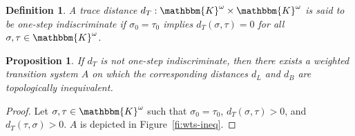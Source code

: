 \documentclass[copyright,creativecommons,sharealike]{eptcs}
\theoremstyle{plain}
\newtheorem{definition}[theorem]{Definition}
\newtheorem{proposition}[theorem]{Proposition}
\renewcommand*\K{\mathbbm{K}}
\begin{document}
\begin{definition}
  A trace distance $d_T: \K^\omega\times \K^\omega$ is said to be
  \emph{one-step indiscriminate} if $\sigma_0= \tau_0$ implies $d_T(
  \sigma, \tau)= 0$ for all $\sigma, \tau\in \K^\omega$.
\end{definition}

\begin{proposition}
  \label{pr:wts-ineq}
  If $d_T$ is not one-step indiscriminate, then there exists a
  weighted transition system $A$ on which the corresponding distances
  $d_L$ and $d_B$ are topologically inequivalent.
\end{proposition}

\begin{proof}
  Let $\sigma, \tau\in \K^\omega$ such that $\sigma_0= \tau_0$, $d_T(
  \sigma, \tau)> 0$, and $d_T( \tau, \sigma)> 0$.  $A$ is depicted in
  Figure~\ref{fi:wts-ineq}.


\end{proof}
\end{document}
